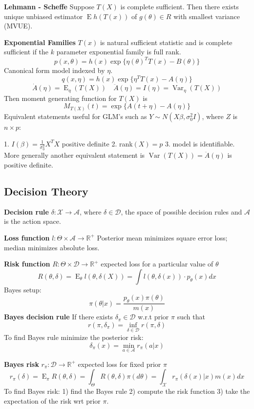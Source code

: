 \documentclass[10pt, twocolumn]{article}
\newcommand{\Expect}{\operatorname{E}}
\newcommand{\Var}{\operatorname{Var}}
\begin{document}
\textbf{Lehmann - Scheffe} Suppose $T(X)$ is complete sufficient. Then
there exists unique unbiased estimator $\Expect h(T(x))$ of $g(\theta) \in
R$ with smallest variance (MVUE). 

\textbf{Exponential Families} $T(x)$ is natural sufficient statistic and is
complete sufficient if the $k$ parameter exponential family is full rank.
\[
    p(x, \theta) = h(x) \exp \{ \eta(\theta)^T T(x) - B(\theta) \}
\]
Canonical form model indexed by $\eta$.
\[
    q(x, \eta) = h(x) \exp \{ \eta^T T(x) - A(\eta) \}
\]
\[
    \dot{A} (\eta) = \Expect_\eta (T(X)) \quad
    \ddot{A} (\eta) = I(\eta) = \Var_\eta (T(X))
\]
Then moment generating function for $T(X)$ is
\[
    M_{T(X)}(t) = \exp \{A(t + \eta) - A(\eta) \}
\]
Equivalent statements useful for GLM's such as $Y \sim N(X \beta,
\sigma_0^2 I)$, where $Z$ is $n \times p$:

1. $I(\beta) = \frac{1}{\sigma_0^2} X^T X$ positive definite
2. rank$(X) = p$
3. model is identifiable. More generally another equivalent statement is
$\Var (T(X)) = \ddot{A} (\eta)$ is positive definite.

\subsection*{Decision Theory}

\textbf{Decision rule} $\delta: \mathcal{X} \rightarrow \mathcal{A}$, where 
$\delta \in \mathcal{D}$, the space of possible decision rules and
$\mathcal{A}$ is the action space.

\textbf{Loss function} $l: \Theta \times \mathcal{A} \rightarrow \mathbb{R}^+$
Posterior mean minimizes square error loss; median minimizes absolute loss.

\textbf{Risk function} $R: \Theta \times \mathcal{D} \rightarrow
\mathbb{R}^+$ expected loss for a particular value of $\theta$
\[
    R(\theta, \delta) = \Expect_\theta l(\theta, \delta(X)) = \int
    l(\theta, \delta(x)) \cdot p_\theta (x) dx
\]
Bayes setup:
\[
    \pi(\theta | x) = \frac{p_\theta (x) \pi(\theta)}{m(x)}
\]
\textbf{Bayes decision rule} If there exists $\delta_\pi \in \mathcal{D}$
w.r.t prior $\pi$ such that
\[
    r(\pi, \delta_\pi) = \inf_{\delta \in \mathcal{D}} r(\pi, \delta)
\]
To find Bayes rule minimize the posterior risk:
\[
    \delta_\pi (x) = \min_{a \in \mathcal{A}} r_\pi (a | x)
\]

\textbf{Bayes risk} $r_\pi : \mathcal{D} \rightarrow
\mathbb{R}^+$ expected loss for fixed prior $\pi$
\[
    r_\pi (\delta) = \Expect_\pi R(\theta, \delta) 
    = \int_\Theta R(\theta, \delta) \pi (d \theta)
    = \int_\mathcal{X} r_\pi(\delta(x) | x) m(x) dx
\]
To find Bayes risk: 1) find the Bayes rule 2) compute the risk function 3)
take the expectation of the risk wrt prior $\pi$.
\end{document}
